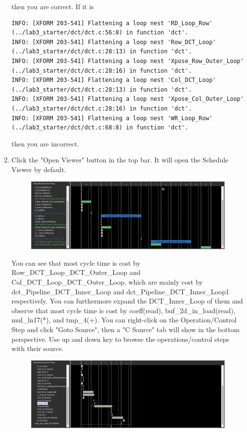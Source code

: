 \documentclass[a4paper,12pt,twoside]{article}
\begin{document}
\begin{enumerate}
    then you are correct. If it is
    \begin{verbatim}
INFO: [XFORM 203-541] Flattening a loop nest 'RD_Loop_Row' (../lab3_starter/dct/dct.c:56:8) in function 'dct'.
INFO: [XFORM 203-541] Flattening a loop nest 'Row_DCT_Loop' (../lab3_starter/dct/dct.c:28:13) in function 'dct'.
INFO: [XFORM 203-541] Flattening a loop nest 'Xpose_Row_Outer_Loop' (../lab3_starter/dct/dct.c:28:16) in function 'dct'.
INFO: [XFORM 203-541] Flattening a loop nest 'Col_DCT_Loop' (../lab3_starter/dct/dct.c:28:13) in function 'dct'.
INFO: [XFORM 203-541] Flattening a loop nest 'Xpose_Col_Outer_Loop' (../lab3_starter/dct/dct.c:28:16) in function 'dct'.
INFO: [XFORM 203-541] Flattening a loop nest 'WR_Loop_Row' (../lab3_starter/dct/dct.c:68:8) in function 'dct'.
    \end{verbatim}
    then you are incorrect.
    \item Click the "Open Viewer" button in the top bar. It will open the Schedule Viewer by default.
    \begin{figure}[H]
        \centering
        \includegraphics[width=\textwidth]{images/14.png}
    \end{figure}
    You can see that most cycle time is cost by Row\_DCT\_Loop\_DCT\_Outer\_Loop and Col\_DCT\_Loop\_DCT\_Outer\_Loop, which are mainly cost by\\
    dct\_Pipeline\_DCT\_Inner\_Loop and dct\_Pipeline\_DCT\_Inner\_Loop1 respectively. You can furthermore expand the DCT\_Inner\_Loop of them and observe that most cycle time is cost by coeff(read), buf\_2d\_in\_load(read), mul\_ln17(*), and tmp\_4(+). You can right-click on the Operation/Control Step and click "Goto Source", then a "C Source" tab will show in the bottom perspective. Use up and down key to browse the operations/control steps with their source.
    \begin{figure}[H]
        \centering
        \includegraphics[width=\textwidth]{images/15.png}

\end{figure}
\end{enumerate}
\end{document}
